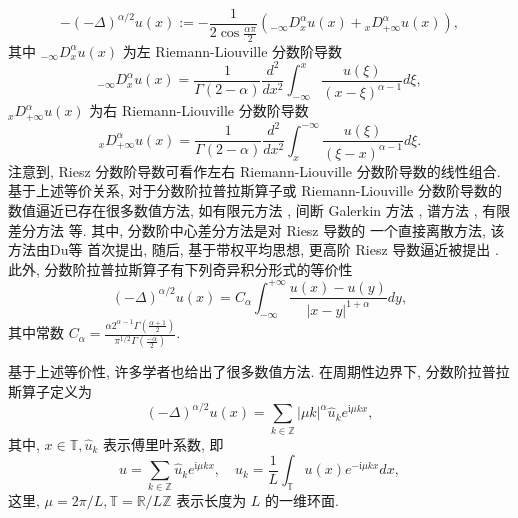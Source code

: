 \begin{equation}
-(-\Delta)^{\alpha / 2} u(x):=-\frac{1}{2 \cos \frac{\alpha \pi}{2}}\left({ }_{-\infty }D_x^\alpha u(x)+{ }_x D_{+\infty}^\alpha u(x)\right),
\end{equation}
其中 ${ }_{-\infty} D_x^\alpha u(x)$ 为左 Riemann-Liouville 分数阶导数
\begin{equation}
{ }_{-\infty} D_x^\alpha u(x)=\frac{1}{\Gamma(2-\alpha)} \frac{d^2}{d x^2} \int_{-\infty}^x \frac{u(\xi)}{(x-\xi)^{\alpha-1}} d \xi,
\end{equation}
${ }_x D_{+\infty}^\alpha u(x)$ 为右 Riemann-Liouville 分数阶导数
\begin{equation}
{ }_x D_{+\infty}^\alpha u(x)=\frac{1}{\Gamma(2-\alpha)} \frac{d^2}{d x^2} \int^{-\infty}_x \frac{u(\xi)}{(\xi-x)^{\alpha-1}} d \xi .
\end{equation}
注意到, Riesz 分数阶导数可看作左右 Riemann-Liouville 分数阶导数的线性组合.
基于上述等价关系, 对于分数阶拉普拉斯算子或 Riemann-Liouville 分数阶导数的数值逼近已存在很多数值方法, 如有限元方法 \cite{dengFiniteElementMethod2009,ervinNumericalApproximationTime2007}, 间断 Galerkin 方法 \cite{xuDiscontinuousGalerkinMethod2014}, 谱方法 \cite{zayernouriFractionalSpectralCollocation2014,zengCrankNicolsonADI2014}, 有限差分方法 \cite{chenFourthOrderAccurate2014,meerschaertFiniteDifferenceApproximations2004} 等. 
其中, 分数阶中心差分方法是对 Riesz 导数的 一个直接离散方法, 该方法由Du等 \cite{duAnalysisApproximationNonlocal2012} 首次提出, 随后, 基于带权平均思想, 更高阶 Riesz 导数逼近被提出 \cite{dingHighorderAlgorithmsRiesz2015,zhangFourthOrderCompactDifference2014}.
此外, 分数阶拉普拉斯算子有下列奇异积分形式的等价性 \cite{duAnalysisApproximationNonlocal2012}
\begin{equation}
(-\Delta)^{\alpha / 2} u(x)=C_\alpha \int_{-\infty}^{+\infty} \frac{u(x)-u(y)}{|x-y|^{1+\alpha}} d y,
\end{equation}
其中常数 $C_\alpha=\frac{\alpha 2^{\alpha-1} \Gamma\left(\frac{\alpha+1}{2}\right)}{\pi^{1 / 2} \Gamma\left(\frac{-\alpha}{2}\right)}$. 

基于上述等价性, 许多学者也给出了很多数值方法\cite{gaoMeanExitTime2014,huangNumericalMethodsFractional2014}. 在周期性边界下, 分数阶拉普拉斯算子定义为 \cite{guoFractionalPartialDifferential2015}
\begin{equation}
(-\Delta)^{\alpha / 2} u(x)=\sum_{k \in \mathbb{Z}}|\mu k|^\alpha \hat{u}_k e^{\mathrm{i} \mu k x},
\end{equation}
其中, $x \in \mathbb{T}, \hat{u}_k$ 表示傅里叶系数, 即
\begin{equation}
u=\sum_{k \in \mathbb{Z}} \hat{u}_k e^{\mathrm{i} \mu k x}, \quad \hat{u}_k=\frac{1}{L} \int_{\mathbb{T}} u(x) e^{-\mathrm{i} \mu k x} d x,
\end{equation}
这里, $\mu=2 \pi / L, \mathbb{T}=\mathbb{R} / L \mathbb{Z}$ 表示长度为 $L$ 的一维环面.


